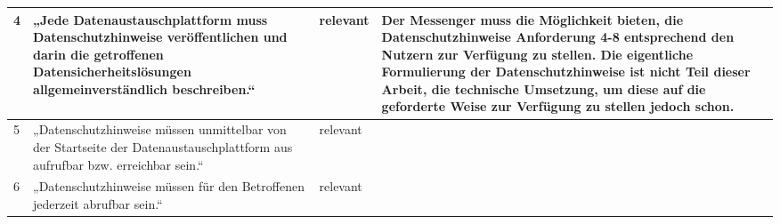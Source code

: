 \begin{longtable}{p{0.6cm}|p{6cm}|p{2cm}|p{6cm}}
    4      & „Jede Datenaustauschplattform muss Datenschutzhinweise veröffentlichen und darin die getroffenen Datensicherheitslösungen allgemeinverständlich beschreiben.“                                                                                                                                        & relevant           & Der Messenger muss die Möglichkeit bieten, die Datenschutzhinweise Anforderung 4-8 entsprechend den Nutzern zur Verfügung zu stellen. Die eigentliche Formulierung der Datenschutzhinweise ist nicht Teil dieser Arbeit, die technische Umsetzung, um diese auf die geforderte Weise zur Verfügung zu stellen jedoch schon.                                                                                                                                                                                                                                         \\ \hline
    5      & „Datenschutzhinweise müssen unmittelbar von der Startseite der Datenaustauschplattform aus aufrufbar bzw. erreichbar sein.“                                                                                                                                                                          & relevant           &                                                                                                                                                                                                                                                                                                                                                                                                                                                                                                                                                                     \\ \hline
    6      & „Datenschutzhinweise müssen für den Betroffenen jederzeit abrufbar sein.“                                                                                                                                                                                                                            & relevant           &                                                                                                                                                                                                                                                                                                                                                                                                                                                                                                                                                                     \\ \hline

\end{longtable}

